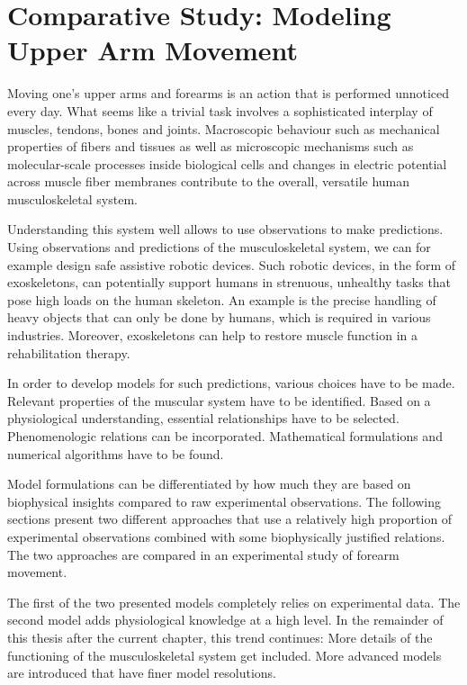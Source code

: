 
\chapter{Comparative Study: Modeling Upper Arm Movement}\label{chap:comparative_study}

Moving one's upper arms and forearms is an action that is performed unnoticed every day. 
What seems like a trivial task involves a sophisticated interplay of muscles, tendons, bones and joints. Macroscopic behaviour such as mechanical properties of fibers and tissues as well as microscopic mechanisms such as molecular-scale processes inside biological cells and changes in electric potential across muscle fiber membranes contribute to the overall, versatile human musculoskeletal system.

Understanding this system well allows to use observations to make predictions.
Using observations and predictions of the musculoskeletal system, we can for example design safe assistive robotic devices.
Such robotic devices, in the form of exoskeletons, can potentially support humans in strenuous, unhealthy tasks that pose high loads on the human skeleton. An example is the precise handling of heavy objects that can only be done by humans, which is required in various industries. Moreover, exoskeletons can help to restore muscle function in a rehabilitation therapy.

In order to develop models for such predictions, various choices have to be made. 
Relevant properties of the muscular system have to be identified. Based on a physiological understanding, essential relationships have to be selected. Phenomenologic relations can be incorporated. Mathematical formulations and numerical algorithms have to be found.

Model formulations can be differentiated by how much they are based on biophysical insights compared to raw experimental observations. The following sections present two different approaches that use a relatively high proportion of experimental observations combined with some biophysically justified relations. The two approaches are compared in an experimental study of forearm movement. 

The first of the two presented models completely relies on experimental data. The second model adds physiological knowledge at a high level. In the remainder of this thesis after the current chapter, this trend continues: More details of the functioning of the musculoskeletal system get included. More advanced models are introduced that have finer model resolutions.


